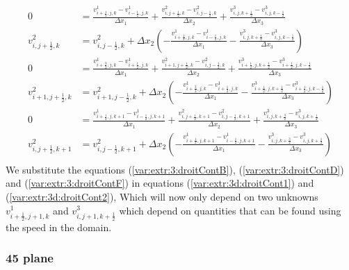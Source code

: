 \begin{align}
\label{var:extr:3:droitContA}
	0&=\frac{v^{1}_{i+\frac{1}{2},j,k}-v^{1}_{i-\frac{1}{2},j,k}}{\Delta x_{1}}+\frac{v^{2}_{i,j+\frac{1}{2},k}-v^{2}_{i,j-\frac{1}{2},k}}{\Delta x_2}+\frac{v^{3}_{i,j,k+\frac{1}{2}}-v^{3}_{i,j,k-\frac{1}{2}}}{\Delta x_{3}}\\
\label{var:extr:3:droitContB}
	v^{2}_{i,j+\frac{1}{2},k}&=v^{2}_{i,j-\frac{1}{2},k}+\Delta x_{2}\left(-\frac{v^{1}_{i+\frac{1}{2},j,k}-v^{1}_{i-\frac{1}{2},j,k}}{\Delta x_{1}}-\frac{v^{3}_{i,j,k+\frac{1}{2}}-v^{3}_{i,j,k-\frac{1}{2}}}{\Delta x_{3}}\right)\\
\label{var:extr:3:droitContC}
	0&=\frac{v^{1}_{i+\frac{3}{2},j,k}-v^{1}_{i+\frac{1}{2},j,k}}{\Delta x_{1}}+\frac{v^{2}_{i+1,j+\frac{1}{2},k}-v^{2}_{i,j-\frac{1}{2},k}}{\Delta x_2}+\frac{v^{3}_{i+\frac{1}{2},j,k+\frac{1}{2}}-v^{3}_{i+\frac{1}{2},j,k-\frac{1}{2}}}{\Delta x_{3}}\\
\label{var:extr:3:droitContD}
	v^{2}_{i+1,j+\frac{1}{2},k}&=v^{2}_{i+1,j-\frac{1}{2},k}+\Delta x_{2}\left(-\frac{v^{1}_{i+\frac{3}{2},j,k}-v^{1}_{i+\frac{1}{2},j,k}}{\Delta x_{1}}-\frac{v^{3}_{i+\frac{1}{2},j,k+\frac{1}{2}}-v^{3}_{i+\frac{1}{2},j,k-\frac{1}{2}}}{\Delta x_{3}}\right)\\
	\label{var:extr:3:droitContE}
	0&=\frac{v^{1}_{i+\frac{1}{2},j,k+1}-v^{1}_{i-\frac{1}{2},j,k+1}}{\Delta x_{1}}+\frac{v^{2}_{i,j+\frac{1}{2},k+1}-v^{2}_{i,j-\frac{1}{2},k+1}}{\Delta x_2}+\frac{v^{3}_{i,j,k+\frac{3}{2}}-v^{3}_{i,j,k+\frac{1}{2}}}{\Delta x_{3}}\\
\label{var:extr:3:droitContF}
	v^{2}_{i,j+\frac{1}{2},k+1}&=v^{2}_{i,j-\frac{1}{2},k+1}+\Delta x_{2}\left(-\frac{v^{1}_{i+\frac{1}{2},j,k+1}-v^{1}_{i-\frac{1}{2},j,k+1}}{\Delta x_{1}}-\frac{v^{3}_{i,j,k+\frac{3}{2}}-v^{3}_{i,j,k+\frac{1}{2}}}{\Delta x_{3}}\right)\\
\end{align}
We substitute the  equations (\ref{var:extr:3:droitContB}), (\ref{var:extr:3:droitContD}) and (\ref{var:extr:3:droitContF})  in equations (\ref{var:extr:3d:droitCont1}) and (\ref{var:extr:3d:droitCont2}),
Which will now only depend on two unknowns $v^{1}_{i+\frac{1}{2},j+1,k}$ and $v^{3}_{i,j+1,k+\frac{1}{2}}$ which depend on quantities that can be found using the speed in the domain.

\subsubsection{\unit{45}{\degree} plane}

